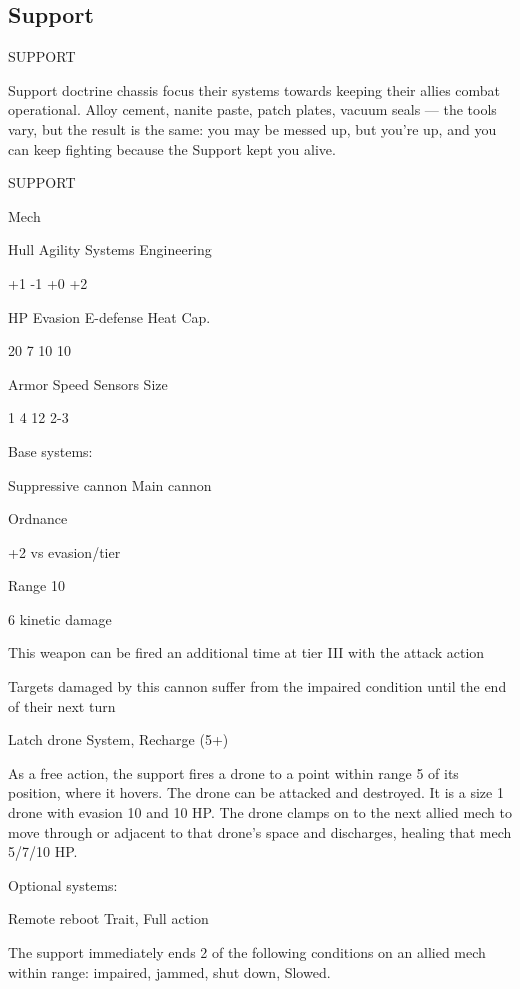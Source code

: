 \subsection{Support}

                                               SUPPORT

Support doctrine chassis focus their systems towards keeping their allies combat operational.
Alloy cement, nanite paste, patch plates, vacuum seals — the tools vary, but the result is the
same: you may be messed up, but you're up, and you can keep fighting because the Support
kept you alive.


 SUPPORT

 Mech

 Hull       Agility      Systems       Engineering

 +1         -1           +0            +2

 HP         Evasion      E-defense     Heat Cap.

 20         7            10            10

 Armor      Speed        Sensors       Size

 1          4            12            2-3

Base systems:

Suppressive cannon
Main cannon

Ordnance

+2 vs evasion/tier

Range 10

6 kinetic damage

This weapon can be fired an additional time at tier III with the attack action

Targets damaged by this cannon suffer from the impaired condition until the end of their next
turn


Latch drone
System, Recharge (5+)

As a free action, the support fires a drone to a point within range 5 of its position, where it
hovers. The drone can be attacked and destroyed. It is a size 1 drone with evasion 10 and 10 HP.
The drone clamps on to the next allied mech to move through or adjacent to that drone's space
and discharges, healing that mech 5/7/10 HP.


Optional systems:

Remote reboot
Trait, Full action





The support immediately ends 2 of the following conditions on an allied mech within range:
impaired, jammed, shut down, Slowed.


